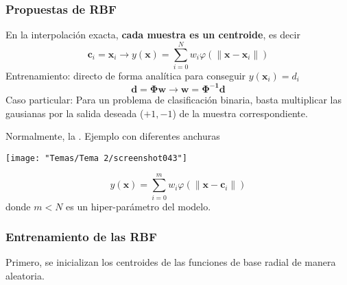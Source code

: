 \subsubsection{Propuestas de RBF}
En la interpolación exacta, \textbf{cada muestra es un centroide}, es decir \[ \mathbf{c}_i=\mathbf{x}_i\longrightarrow y(\mathbf{x})=\sum_{i=0}^{N}w_i\varphi(\|\mathbf{x-x}_i\|) \] Entrenamiento: directo de forma analítica para conseguir $y(\mathbf{x}_i)=d_i$\[ \mathbf{d=\Phi w\longrightarrow w=\Phi^{-1}d} \]Caso particular: Para un problema de clasificación binaria, basta multiplicar las gausianas por la salida deseada ($+1,-1$) de la muestra correspondiente.

Normalmente, la . Ejemplo con diferentes anchuras
\begin{center} 
	\texttt{[image: "Temas/Tema 2/screenshot043"]}
\end{center}
\[ y(\mathbf{x})=\sum_{i=0}^{m}w_i\varphi(\|\mathbf{x-c}_i\|) \] donde $m<N$ es un hiper-parámetro del modelo.
\subsubsection{Entrenamiento de las RBF}
Primero, se inicializan los centroides de las funciones de base radial de manera aleatoria.


